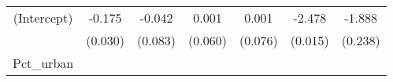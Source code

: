 \documentclass[12pt,twoside]{reedthesis}
\begin{document}
\begin{longtable}[]{@{}ccccccc@{}}
  \midrule
  \endhead
  \begin{minipage}[t]{0.14\columnwidth}\centering\strut
  (Intercept)\strut
  \end{minipage} & \begin{minipage}[t]{0.10\columnwidth}\centering\strut
  -0.175\strut
  \end{minipage} & \begin{minipage}[t]{0.11\columnwidth}\centering\strut
  -0.042\strut
  \end{minipage} & \begin{minipage}[t]{0.11\columnwidth}\centering\strut
  0.001\strut
  \end{minipage} & \begin{minipage}[t]{0.11\columnwidth}\centering\strut
  0.001\strut
  \end{minipage} & \begin{minipage}[t]{0.11\columnwidth}\centering\strut
  -2.478\strut
  \end{minipage} & \begin{minipage}[t]{0.12\columnwidth}\centering\strut
  -1.888\strut
  \end{minipage}\tabularnewline
  \begin{minipage}[t]{0.14\columnwidth}\centering\strut
  \strut
  \end{minipage} & \begin{minipage}[t]{0.10\columnwidth}\centering\strut
  (0.030)\strut
  \end{minipage} & \begin{minipage}[t]{0.11\columnwidth}\centering\strut
  (0.083)\strut
  \end{minipage} & \begin{minipage}[t]{0.11\columnwidth}\centering\strut
  (0.060)\strut
  \end{minipage} & \begin{minipage}[t]{0.11\columnwidth}\centering\strut
  (0.076)\strut
  \end{minipage} & \begin{minipage}[t]{0.11\columnwidth}\centering\strut
  (0.015)\strut
  \end{minipage} & \begin{minipage}[t]{0.12\columnwidth}\centering\strut
  (0.238)\strut
  \end{minipage}\tabularnewline
  \begin{minipage}[t]{0.14\columnwidth}\centering\strut
  Pct\_urban\strut
  \end{minipage} & \begin{minipage}[t]{0.10\columnwidth}\centering\strut

\end{minipage}
\end{longtable}
\end{document}
